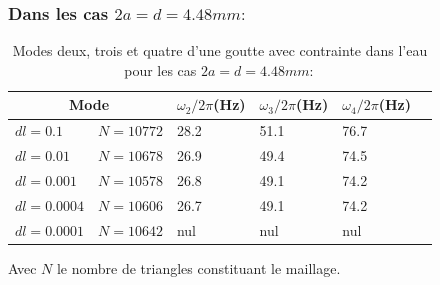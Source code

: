 \documentclass[a4paper]{report}
\begin{document}
\subsubsection{Dans les cas $2a = d = 4.48 mm :$}
\begin{table}[htp]

\begin{center}
    \begin{tabular}{ | l | l | l | l | l | l | }
    \hline
    \multicolumn{2}{|c|}{Mode}  & $\omega_2/2\pi$(Hz) & $\omega_3/2\pi$(Hz) & $\omega_4/2\pi$(Hz) \\
    \hline
    $dl = 0.1$    & $N = 10772$ & 28.2                & 51.1                & 76.7 \\
    \hline
    $dl = 0.01$   & $N = 10678$ & 26.9                & 49.4                & 74.5 \\
    \hline
    $dl = 0.001$  & $N = 10578$ & 26.8                & 49.1                & 74.2 \\
    \hline
    $dl = 0.0004$ & $N = 10606$ & 26.7                & 49.1                & 74.2 \\
    \hline
    $dl = 0.0001$ & $N = 10642$ & nul                 & nul                 & nul \\
    \hline
    \end{tabular}
\end{center}
\caption{Modes deux, trois et quatre d'une goutte avec contrainte dans l'eau pour les cas $2a = d = 4.48 mm :$}
\end{table}
Avec $N$ le nombre de triangles constituant le maillage.



\end{document}

